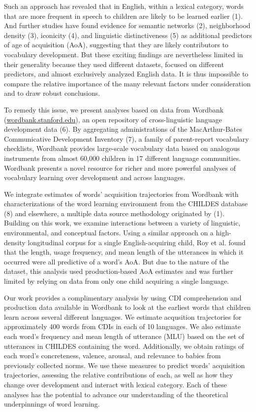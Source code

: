 \documentclass[9pt,twocolumn,twoside]{pnas-new}
\begin{document}
Such an approach has revealed that in English, within a lexical
category, words that are more frequent in speech to children are likely
to be learned earlier (1). And further studies have found evidence for
semantic networks (2), neighborhood density (3), iconicity (4), and
linguistic distinctiveness (5) as additional predictors of age of
acquisition (AoA), suggesting that they are likely contributors to
vocabulary development. But these exciting findings are nevertheless
limited in their generality because they used different datasets,
focused on different predictors, and almost exclusively analyzed English
data. It is thus impossible to compare the relative importance of the
many relevant factors under consideration and to draw robust
conclusions.

To remedy this issue, we present analyses based on data from Wordbank
(\href{http://wordbank.stanford.edu}{wordbank.stanford.edu}), an open
repository of cross-linguistic language development data (6). By
aggregating administrations of the MacArthur-Bates Communicative
Development Inventory (7), a family of parent-report vocabulary
checklists, Wordbank provides large-scale vocabulary data based on
analogous instruments from almost 60,000 children in 17 different
language communities. Wordbank presents a novel resource for richer and
more powerful analyses of vocabulary learning over development and
across languages.

We integrate estimates of words' acquisition trajectories from Wordbank
with characterizations of the word learning environment from the CHILDES
database (8) and elsewhere, a multiple data source methodology
originated by (1). Building on this work, we examine interactions
between a variety of linguistic, environmental, and conceptual factors.
Using a similar approach on a high-density longitudinal corpus for a
single English-acquiring child, Roy et al. found that the length, usage
frequency, and mean length of the utterances in which it occurred were
all predictive of a word's AoA. But due to the nature of the dataset,
this analysis used production-based AoA estimates and was further
limited by relying on data from only one child acquiring a single
language.

Our work provides a complimentary analysis by using CDI comprehension
and production data available in Wordbank to look at the earliest words
that children learn across several different languages. We estimate
acqusition trajectories for approximately 400 words from CDIs in each of
10 languages. We also estimate each word's frequency and mean length of
utterance (MLU) based on the set of utterances in CHILDES containing the
word. Additionally, we obtain ratings of each word's concreteness,
valence, arousal, and relevance to babies from previously collected
norms. We use these measures to predict words' acquisition trajectories,
assessing the relative contributions of each, as well as how they change
over development and interact with lexical category. Each of these
analyses has the potential to advance our understanding of the
theoretical underpinnings of word learning.
\end{document}

